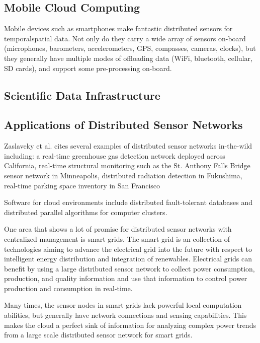 \documentclass[twocolumn]{article}
\begin{document}

\subsection{Mobile Cloud Computing}
Mobile devices such as smartphones make fantastic distributed sensors for temporalspatial data. Not only do they carry a wide array of sensors on-board (microphones, barometers, accelerometers, GPS, compasses, cameras, clocks), but they generally have multiple modes of offloading data (WiFi, bluetooth, cellular, SD cards), and support some pre-processing on-board.

\subsection{Scientific Data Infrastructure}

\subsection{Applications of Distributed Sensor Networks}
Zaslaveky et al. \cite{zaslavsky_sensing_2013} cites several examples of distributed sensor networks in-the-wild including: a real-time greenhouse gas detection network deployed across California, real-time structural monitoring such as the St. Anthony Falls Bridge sensor network in Minneapolis, distributed radiation detection in Fukushima, real-time parking space inventory in San Francisco

Software for cloud environments include distributed fault-tolerant databases and distributed parallel algorithms for computer clusters. 

One area that shows a lot of promise for distributed sensor networks with centralized management is smart grids. The smart grid is an collection of technologies aiming to advance the electrical grid into the future with respect to intelligent energy distribution and integration of renewables. Electrical grids can benefit by using a large distributed sensor network to collect power consumption, production, and quality information and use that information to control power production and consumption in real-time. 

Many times, the sensor nodes in smart grids lack powerful local computation abilities, but generally have network connections and sensing capabilities. This makes the cloud a perfect sink of information for analyzing complex power trends from a large scale distributed sensor network for smart grids\cite{botta_integration_2016}.
\end{document}
